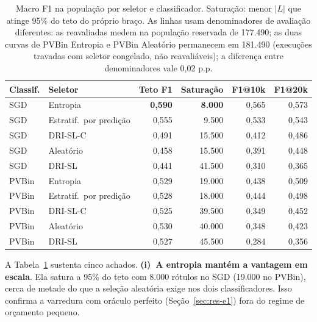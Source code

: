 \begin{table}[htb]
\centering
\caption{Macro F1 na população por seletor e classificador.
Saturação: menor $|L|$ que atinge 95\% do teto do próprio braço. As linhas
usam denominadores de avaliação diferentes: as reavaliadas medem na
população reservada de 177.490; as duas curvas de PVBin Entropia e PVBin
Aleatório permanecem em 181.490 (execuções travadas com seletor congelado,
não reavaliáveis); a diferença entre denominadores vale 0,02 p.p.}
\label{tab:e6}
\small
\begin{tabular}{ll rrrr}
\toprule
\textbf{Classif.} & \textbf{Seletor} & \textbf{Teto F1} & \textbf{Saturação} &
\textbf{F1@10k} & \textbf{F1@20k} \\
\midrule
SGD & Entropia   & \textbf{0,590} & \textbf{8.000} & 0,565 & 0,573 \\
SGD & Estratif.\ por predição & 0,555 & 9.500 & 0,533 & 0,543 \\
SGD & DRI-SL-C   & 0,491 & 15.500 & 0,412 & 0,486 \\
SGD & Aleatório  & 0,458 & 15.500 & 0,391 & 0,448 \\
SGD & DRI-SL     & 0,441 & 41.500 & 0,310 & 0,365 \\
\midrule
PVBin & Entropia  & 0,529 & 19.000 & 0,438 & 0,509 \\
PVBin & Estratif.\ por predição & 0,528 & 18.000 & 0,444 & 0,498 \\
PVBin & DRI-SL-C  & 0,525 & 39.500 & 0,349 & 0,452 \\
PVBin & Aleatório & 0,530 & 40.000 & 0,348 & 0,423 \\
PVBin & DRI-SL    & 0,527 & 45.500 & 0,284 & 0,356 \\
\bottomrule
\end{tabular}
\end{table}

A Tabela~\ref{tab:e6} sustenta cinco achados. \textbf{(i)~A entropia mantém a vantagem em escala}. Ela satura a 95\% do teto com 8.000
rótulos no SGD (19.000 no PVBin), cerca de metade do que a seleção aleatória
exige nos dois classificadores. Isso confirma a varredura com oráculo perfeito
(Seção~\ref{sec:res-e1}) fora do regime de orçamento pequeno.

